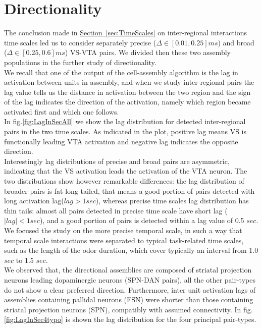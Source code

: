 \section{Directionality} 
\label{sec:Directionality}
The conclusion made in \hyperref[sec:TimeScales]{Section~\ref*{sec:TimeScales}} on inter-regional interactions time scales led us to consider separately precise ($\Delta \in [0.01,0.25] ms$) and broad ($\Delta \in [0.25,0.6] ms$) VS-VTA pairs. We divided then these two assembly populations in the further study of directionality.\\We recall that one of the output of the cell-assembly algorithm is the lag in activation between units in assembly, and when we study inter-regional pairs the lag value tells us the distance in activation between the two region and the sign of the lag indicates the direction of the activation, namely which region became activated first and which one follows.\\
In fig.\ref{fig:LagInSecAll} we show the lag distribution for detected inter-regional pairs in the two time scales. As indicated in the plot, positive lag means VS is functionally leading VTA activation and negative lag indicates the opposite direction.\\Interestingly lag distributions of precise and broad pairs are asymmetric, indicating that the VS activation leads the activation of the VTA neuron. The two distributions show however remarkable differences: the lag distribution of broader pairs is fat-long tailed, that means a good portion of pairs detected with long activation lag($lag > 1 sec$), whereas precise time scales lag distribution has thin tails: almost all pairs detected in precise time scale have short lag ($|lag| < 1 sec$), and a good portion of pairs is detected within a lag value of 0.5 $sec$.\\
We focused the study on the more precise temporal scale, in such a way that temporal scale interactions were separated to typical task-related time scales, such as the length of the odor duration, which cover typically an interval from 1.0 $sec$ to 1.5 $sec$.\\
We observed that, the directional assemblies are composed of striatal projection neurons leading dopaminergic neurons (SPN-DAN pairs), all the other pair-types do not show a clear preferred direction. Furthermore, inter unit activation lags of assemblies containing pallidal neurons (FSN) were shorter than those containing striatal projection neurons (SPN), compatibly with assumed connectivity. In fig.\ref{fig:LagInSec4typo} is shown the lag distribution for the four principal pair-types.\\
